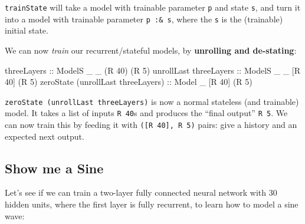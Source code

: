 \documentclass[]{article}
\newenvironment{Shaded}{}{}
\newcommand{\DataTypeTok}[1]{\textcolor[rgb]{0.56,0.13,0.00}{#1}}
\newcommand{\DecValTok}[1]{\textcolor[rgb]{0.25,0.63,0.44}{#1}}
\newcommand{\NormalTok}[1]{#1}
\newcommand{\OtherTok}[1]{\textcolor[rgb]{0.00,0.44,0.13}{#1}}
\begin{document}
\texttt{trainState} will take a model with trainable parameter \texttt{p} and
state \texttt{s}, and turn it into a model with trainable parameter
\texttt{p\ :\&\ s}, where the \texttt{s} is the (trainable) initial state.

We can now \emph{train} our recurrent/stateful models, by \textbf{unrolling and
de-stating}:

\begin{Shaded}
\begin{Highlighting}[]
\OtherTok{threeLayers                        ::} \DataTypeTok{ModelS}\NormalTok{ _ _ (}\DataTypeTok{R} \DecValTok{40}\NormalTok{) (}\DataTypeTok{R} \DecValTok{5}\NormalTok{)}
\NormalTok{unrollLast}\OtherTok{ threeLayers             ::} \DataTypeTok{ModelS}\NormalTok{ _ _ [}\DataTypeTok{R} \DecValTok{40}\NormalTok{] (}\DataTypeTok{R} \DecValTok{5}\NormalTok{)}
\NormalTok{zeroState (unrollLast threeLayers)}\OtherTok{ ::} \DataTypeTok{Model}\NormalTok{  _   [}\DataTypeTok{R} \DecValTok{40}\NormalTok{] (}\DataTypeTok{R} \DecValTok{5}\NormalTok{)}
\end{Highlighting}
\end{Shaded}

\texttt{zeroState\ (unrollLast\ threeLayers)} is now a normal stateless (and
trainable) model. It takes a list of inputs \texttt{R\ 40}s and produces the
``final output'' \texttt{R\ 5}. We can now train this by feeding it with
\texttt{({[}R\ 40{]},\ R\ 5)} pairs: give a history and an expected next output.

\hypertarget{show-me-a-sine}{%
\subsection{Show me a Sine}\label{show-me-a-sine}}

Let's see if we can train a two-layer fully connected neural network with 30
hidden units, where the first layer is fully recurrent, to learn how to model a
sine wave:
\end{document}
